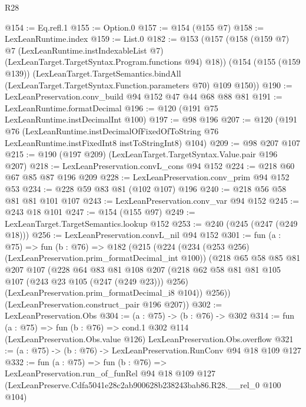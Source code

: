 \begin{lexlean}{R28}
\begin{coremodule}
@154 := Eq.refl.{1}
@155 := Option.{0}
@157 := @154 (@155 @7)
@158 := LexLeanRuntime.index
@159 := List.{0}
@182 := @153
    (@157
      (@158
        (@159 @7)
        @7
        (LexLeanRuntime.instIndexableList @7)
        (LexLeanTarget.TargetSyntax.Program.functions @94)
        @18))
    (@154
      (@155 (@159 @139))
      (LexLeanTarget.TargetSemantics.bindAll
        (LexLeanTarget.TargetSyntax.Function.parameters @70)
        @109
        @150))
@190 := LexLeanPreservation.conv_build @94 @152 @47 @44 @68 @88 @81
@191 := LexLeanRuntime.formatDecimal
@196 := @120 (@191 @75 LexLeanRuntime.instDecimalInt @100)
@197 := @98 @196
@207 := @120
    (@191
      @76
      (LexLeanRuntime.instDecimalOfFixedOfToString
        @76
        LexLeanRuntime.instFixedInt8
        instToStringInt8)
      @104)
@209 := @98 @207 @107
@215 := @190 (@197 @209) (LexLeanTarget.TargetSyntax.Value.pair @196 @207)
@218 := LexLeanPreservation.convL_cons @94 @152
@224 := @218 @60 @67 @85 @87 @196 @209
@228 := LexLeanPreservation.conv_prim @94 @152 @53
@234 := @228 @59 @83 @81 (@102 @107) @196
@240 := @218 @56 @58 @81 @81 @101 @107
@243 := LexLeanPreservation.conv_var @94 @152
@245 := @243 @18 @101
@247 := @154 (@155 @97)
@249 := LexLeanTarget.TargetSemantics.lookup @152
@253 := @240 (@245 (@247 (@249 @18)))
@256 := LexLeanPreservation.convL_nil @94 @152
@301 := fun (a : @75) =>
  fun (b : @76) =>
  @182
    (@215
      (@224
        (@234 (@253 @256) (LexLeanPreservation.prim_formatDecimal_int @100))
        (@218
          @65
          @58
          @85
          @81
          @207
          @107
          (@228
            @64
            @83
            @81
            @108
            @207
            (@218 @62 @58 @81 @81 @105 @107 (@243 @23 @105 (@247 (@249 @23))) @256)
            (LexLeanPreservation.prim_formatDecimal_i8 @104))
          @256))
      (LexLeanPreservation.construct_pair @196 @207))
@302 := LexLeanPreservation.Obs
@304 := (a : @75) -> (b : @76) -> @302
@314 := fun (a : @75) =>
  fun (b : @76) =>
  cond.{1} @302 @114 (LexLeanPreservation.Obs.value @126) LexLeanPreservation.Obs.overflow
@321 := (a : @75) -> (b : @76) -> LexLeanPreservation.RunConv @94 @18 @109 @127
@332 := fun (a : @75) =>
  fun (b : @76) =>
  LexLeanPreservation.run_of_funRel
    @94
    @18
    @109
    @127
    (LexLeanPreserve.Cdfa5041e28c2ab900628b238243bab86.R28.__rel_0 @100 @104)
\end{coremodule}
\end{lexlean}
